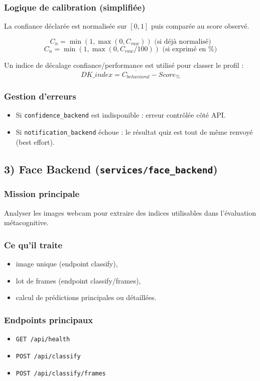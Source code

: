 \documentclass[12pt,a4paper]{article}
\begin{document}
\subsubsection{Logique de calibration (simplifi\'ee)}
La confiance d\'eclar\'ee est normalis\'ee sur $[0,1]$ puis compar\'ee au score observ\'e.

\[
C_n = \min(1,\max(0, C_{raw})) \text{ (si d\'ej\`a normalis\'e)}
\]
\[
C_n = \min(1,\max(0, C_{raw}/100)) \text{ (si exprim\'e en \%)}
\]

Un indice de d\'ecalage confiance/performance est utilis\'e pour classer le profil :
\[
DK\_index = \overline{C_{behavioral}} - Score_{\%}
\]

\subsubsection{Gestion d'erreurs}
\begin{itemize}
    \item Si \texttt{confidence\_backend} est indisponible : erreur contr\^ol\'ee c\^ot\'e API.
    \item Si \texttt{notification\_backend} \'echoue : le r\'esultat quiz est tout de m\^eme renvoy\'e (best effort).
\end{itemize}

\subsection{3) Face Backend (\texttt{services/face\_backend})}
\subsubsection{Mission principale}
Analyser les images webcam pour extraire des indices utilisables dans l'\'evaluation m\'etacognitive.

\subsubsection{Ce qu'il traite}
\begin{itemize}
    \item image unique (endpoint classify),
    \item lot de frames (endpoint classify/frames),
    \item calcul de pr\'edictions principales ou d\'etaill\'ees.
\end{itemize}

\subsubsection{Endpoints principaux}
\begin{itemize}
    \item \texttt{GET /api/health}
    \item \texttt{POST /api/classify}
    \item \texttt{POST /api/classify/frames}
\end{itemize}
\end{document}
